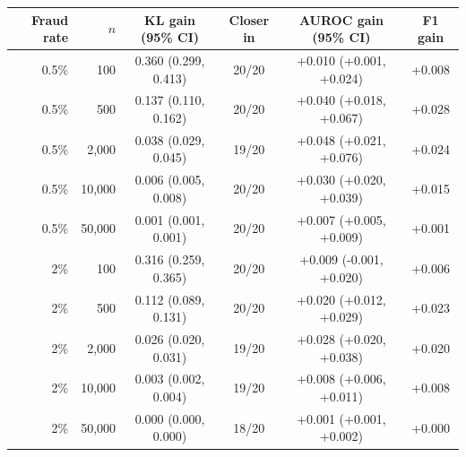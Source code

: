 \begin{tabular}{rrcccc}\toprule
Fraud rate & $n$ & KL gain (95\% CI) & Closer in & AUROC gain (95\% CI) & F1 gain\\\midrule
0.5\% & 100 & 0.360 (0.299, 0.413) & 20/20 & +0.010 (+0.001, +0.024) & +0.008\\
0.5\% & 500 & 0.137 (0.110, 0.162) & 20/20 & +0.040 (+0.018, +0.067) & +0.028\\
0.5\% & 2,000 & 0.038 (0.029, 0.045) & 19/20 & +0.048 (+0.021, +0.076) & +0.024\\
0.5\% & 10,000 & 0.006 (0.005, 0.008) & 20/20 & +0.030 (+0.020, +0.039) & +0.015\\
0.5\% & 50,000 & 0.001 (0.001, 0.001) & 20/20 & +0.007 (+0.005, +0.009) & +0.001\\
2\% & 100 & 0.316 (0.259, 0.365) & 20/20 & +0.009 (-0.001, +0.020) & +0.006\\
2\% & 500 & 0.112 (0.089, 0.131) & 20/20 & +0.020 (+0.012, +0.029) & +0.023\\
2\% & 2,000 & 0.026 (0.020, 0.031) & 19/20 & +0.028 (+0.020, +0.038) & +0.020\\
2\% & 10,000 & 0.003 (0.002, 0.004) & 19/20 & +0.008 (+0.006, +0.011) & +0.008\\
2\% & 50,000 & 0.000 (0.000, 0.000) & 18/20 & +0.001 (+0.001, +0.002) & +0.000\\
\bottomrule\end{tabular}